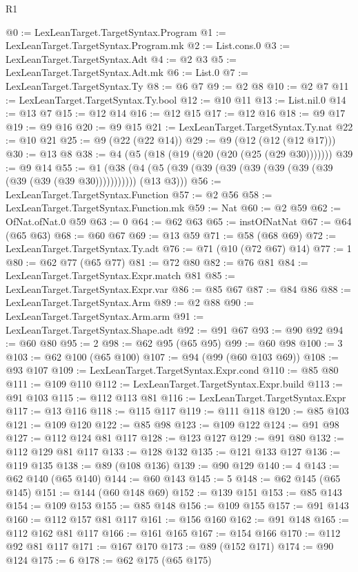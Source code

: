 \begin{lexlean}{R1}
\begin{coremodule}
@0 := LexLeanTarget.TargetSyntax.Program
@1 := LexLeanTarget.TargetSyntax.Program.mk
@2 := List.cons.{0}
@3 := LexLeanTarget.TargetSyntax.Adt
@4 := @2 @3
@5 := LexLeanTarget.TargetSyntax.Adt.mk
@6 := List.{0}
@7 := LexLeanTarget.TargetSyntax.Ty
@8 := @6 @7
@9 := @2 @8
@10 := @2 @7
@11 := LexLeanTarget.TargetSyntax.Ty.bool
@12 := @10 @11
@13 := List.nil.{0}
@14 := @13 @7
@15 := @12 @14
@16 := @12 @15
@17 := @12 @16
@18 := @9 @17
@19 := @9 @16
@20 := @9 @15
@21 := LexLeanTarget.TargetSyntax.Ty.nat
@22 := @10 @21
@25 := @9 (@22 (@22 @14))
@29 := @9 (@12 (@12 (@12 @17)))
@30 := @13 @8
@38 := @4 (@5 (@18 (@19 (@20 (@20 (@25 (@29 @30)))))))
@39 := @9 @14
@55 := @1 (@38 (@4 (@5 (@39 (@39 (@39 (@39 (@39 (@39 (@39 (@39 (@39 (@39 @30))))))))))) (@13 @3)))
@56 := LexLeanTarget.TargetSyntax.Function
@57 := @2 @56
@58 := LexLeanTarget.TargetSyntax.Function.mk
@59 := Nat
@60 := @2 @59
@62 := OfNat.ofNat.{0} @59
@63 := 0
@64 := @62 @63
@65 := instOfNatNat
@67 := @64 (@65 @63)
@68 := @60 @67
@69 := @13 @59
@71 := @58 (@68 @69)
@72 := LexLeanTarget.TargetSyntax.Ty.adt
@76 := @71 (@10 (@72 @67) @14)
@77 := 1
@80 := @62 @77 (@65 @77)
@81 := @72 @80
@82 := @76 @81
@84 := LexLeanTarget.TargetSyntax.Expr.match @81
@85 := LexLeanTarget.TargetSyntax.Expr.var
@86 := @85 @67
@87 := @84 @86
@88 := LexLeanTarget.TargetSyntax.Arm
@89 := @2 @88
@90 := LexLeanTarget.TargetSyntax.Arm.arm
@91 := LexLeanTarget.TargetSyntax.Shape.adt
@92 := @91 @67
@93 := @90 @92
@94 := @60 @80
@95 := 2
@98 := @62 @95 (@65 @95)
@99 := @60 @98
@100 := 3
@103 := @62 @100 (@65 @100)
@107 := @94 (@99 (@60 @103 @69))
@108 := @93 @107
@109 := LexLeanTarget.TargetSyntax.Expr.cond
@110 := @85 @80
@111 := @109 @110
@112 := LexLeanTarget.TargetSyntax.Expr.build
@113 := @91 @103
@115 := @112 @113 @81
@116 := LexLeanTarget.TargetSyntax.Expr
@117 := @13 @116
@118 := @115 @117
@119 := @111 @118
@120 := @85 @103
@121 := @109 @120
@122 := @85 @98
@123 := @109 @122
@124 := @91 @98
@127 := @112 @124 @81 @117
@128 := @123 @127
@129 := @91 @80
@132 := @112 @129 @81 @117
@133 := @128 @132
@135 := @121 @133 @127
@136 := @119 @135
@138 := @89 (@108 @136)
@139 := @90 @129
@140 := 4
@143 := @62 @140 (@65 @140)
@144 := @60 @143
@145 := 5
@148 := @62 @145 (@65 @145)
@151 := @144 (@60 @148 @69)
@152 := @139 @151
@153 := @85 @143
@154 := @109 @153
@155 := @85 @148
@156 := @109 @155
@157 := @91 @143
@160 := @112 @157 @81 @117
@161 := @156 @160
@162 := @91 @148
@165 := @112 @162 @81 @117
@166 := @161 @165
@167 := @154 @166
@170 := @112 @92 @81 @117
@171 := @167 @170
@173 := @89 (@152 @171)
@174 := @90 @124
@175 := 6
@178 := @62 @175 (@65 @175)

\end{coremodule}
\end{lexlean}
